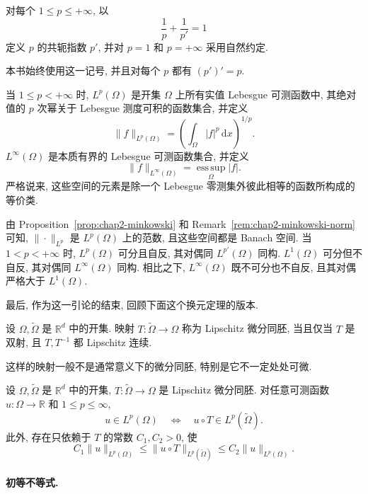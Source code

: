 \begin{Definition}
\label{def:chap2-conjugate-exponent}
对每个 $1\leq p\leq+\infty$, 以
\[
  \frac1p+\frac1{p'}=1
\]
定义 $p$ 的共轭指数 $p'$, 并对 $p=1$ 和 $p=+\infty$ 采用自然约定.
\end{Definition}

本书始终使用这一记号, 并且对每个 $p$ 都有 $(p')'=p$.

当 $1\leq p<+\infty$ 时, $L^p(\Omega)$ 是开集 $\Omega$ 上所有实值 Lebesgue 可测函数中, 其绝对值的 $p$ 次幂关于 Lebesgue 测度可积的函数集合, 并定义
\[
  \|f\|_{L^p(\Omega)}=\left(\int_\Omega|f|^p\,\mathrm{d}x\right)^{1/p}.
\]
$L^\infty(\Omega)$ 是本质有界的 Lebesgue 可测函数集合, 并定义
\[
  \|f\|_{L^\infty(\Omega)}=\operatorname*{ess\,sup}_{\Omega}|f|.
\]
严格说来, 这些空间的元素是除一个 Lebesgue 零测集外彼此相等的函数所构成的等价类.

由 Proposition~\ref{prop:chap2-minkowski} 和 Remark~\ref{rem:chap2-minkowski-norm} 可知, $\|\cdot\|_{L^p}$ 是 $L^p(\Omega)$ 上的范数, 且这些空间都是 Banach 空间. 当 $1<p<+\infty$ 时, $L^p(\Omega)$ 可分且自反, 其对偶同 $L^{p'}(\Omega)$ 同构. $L^1(\Omega)$ 可分但不自反, 其对偶同 $L^\infty(\Omega)$ 同构. 相比之下, $L^\infty(\Omega)$ 既不可分也不自反, 且其对偶严格大于 $L^1(\Omega)$.

最后, 作为这一引论的结束, 回顾下面这个换元定理的版本.

\begin{Definition}
\label{def:chap2-lipschitz-diffeomorphism}
设 $\Omega,\widetilde\Omega$ 是 $\mathbb{R}^d$ 中的开集. 映射 $T:\widetilde\Omega\to\Omega$ 称为 Lipschitz 微分同胚, 当且仅当 $T$ 是双射, 且 $T,T^{-1}$ 都 Lipschitz 连续.
\end{Definition}

这样的映射一般不是通常意义下的微分同胚, 特别是它不一定处处可微.

\begin{Proposition}
\label{prop:chap2-lipschitz-change-variables}
设 $\Omega,\widetilde\Omega$ 是 $\mathbb{R}^d$ 中的开集, $T:\widetilde\Omega\to\Omega$ 是 Lipschitz 微分同胚. 对任意可测函数 $u:\Omega\to\mathbb{R}$ 和 $1\leq p\leq\infty$,
\[
  u\in L^p(\Omega)\quad\Longleftrightarrow\quad u\circ T\in L^p(\widetilde\Omega).
\]
此外, 存在只依赖于 $T$ 的常数 $C_1,C_2>0$, 使
\[
  C_1\|u\|_{L^p(\Omega)}\leq\|u\circ T\|_{L^p(\widetilde\Omega)}
  \leq C_2\|u\|_{L^p(\Omega)}.
\]
\end{Proposition}

\paragraph{初等不等式.}
\label{subsec:chap2-elementary-inequalities}

